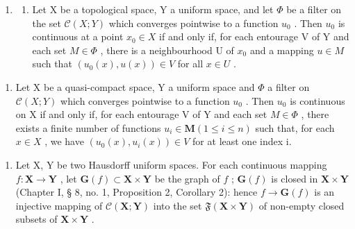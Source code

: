\begin{enumerate}
\def\labelenumi{\arabic{enumi})}
\setcounter{enumi}{5}
\tightlist
\item
  \begin{enumerate}
  \def\labelenumii{\alph{enumii})}
  \tightlist
  \item
    Let X be a topological space, Y a uniform space, and let \(\Phi\) be a filter on the set \(\mathcal{C}(X;Y)\) which converges pointwise to a function \(u_{0}\) . Then \(u_{0}\) is continuous at a point \(x_{0}\in X\) if and only if, for each entourage V of Y and each set \(M\in\Phi\) , there is a neighbourhood U of \(x_{0}\) and a mapping \(u\in M\) such that \((u_{0}(x),u(x))\in V\) for all \(x\in U\) .
  \end{enumerate}
\end{enumerate}

\begin{enumerate}
\def\labelenumi{\alph{enumi})}
\setcounter{enumi}{1}
\tightlist
\item
  Let X be a quasi-compact space, Y a uniform space and \(\Phi\) a filter on \(\mathcal{C}(X;Y)\) which converges pointwise to a function \(u_{0}\) . Then \(u_{0}\) is continuous on X if and only if, for each entourage V of Y and each set \(M\in\Phi\) , there exists a finite number of functions \(u_{i}\in\mathbf{M}(1\leqslant i\leqslant n)\) such that, for each \(x\in X\) , we have \((u_{0}(x),u_{i}(x))\in V\) for at least one index i.
\end{enumerate}

\begin{enumerate}
\def\labelenumi{\arabic{enumi})}
\setcounter{enumi}{6}
\tightlist
\item
  Let X, Y be two Hausdorff uniform spaces. For each continuous mapping \(f: \mathbf{X} \to \mathbf{Y}\) , let \(\mathbf{G}(f) \subset \mathbf{X} \times \mathbf{Y}\) be the graph of \(f\) ; \(\mathbf{G}(f)\) is closed in \(\mathbf{X} \times \mathbf{Y}\) (Chapter I, § 8, no. 1, Proposition 2, Corollary 2): hence \(f \to \mathbf{G}(f)\) is an injective mapping of \(\mathcal{C}(\mathbf{X}; \mathbf{Y})\) into the set \(\mathfrak{F}(\mathbf{X} \times \mathbf{Y})\) of non-empty closed subsets of \(\mathbf{X} \times \mathbf{Y}\) .
\end{enumerate}


